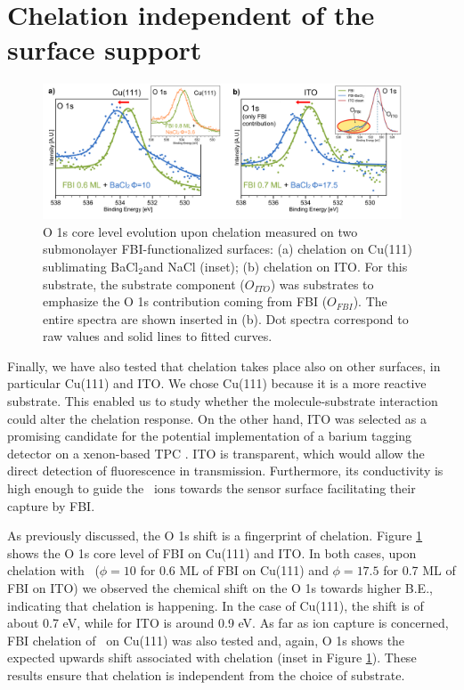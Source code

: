\documentclass[aps,prl,reprint,longbibliography,superscriptaddress, english]{revtex4-1}
\def\BappCl{BaCl$_2$}
\begin{document}
\section{Chelation independent of the surface support}


\begin{figure}[ht!]
	\includegraphics[width=0.95\textwidth]{figures/Figure_5.png}
	\caption{\label{XPS_FBI_Cu_ITO} 
    O 1s core level evolution upon chelation measured on two submonolayer FBI-functionalized surfaces: (a) chelation on Cu(111) sublimating \BappCl and NaCl (inset); (b) chelation on ITO. For this substrate, the substrate component (${O_{ITO}}$) was substrates to emphasize the O 1s contribution coming from FBI (${O_{FBI}}$). The entire spectra are shown inserted in (b). Dot spectra correspond to raw values and solid lines to fitted curves.}
\end{figure} 

Finally, we have also tested that chelation takes place also on other surfaces, in particular Cu(111) and ITO. We chose Cu(111) because it is a more reactive substrate. This enabled us to study whether the molecule-substrate interaction could alter the chelation response. On the other hand, ITO was selected as a promising candidate for the potential implementation of a barium tagging detector on a xenon-based TPC \cite{rivilla_fluorescent_2020}. ITO is transparent, which would allow the direct detection of fluorescence in transmission. Furthermore, its conductivity is high enough to guide the \Bapp\ ions towards the sensor surface facilitating their capture by FBI. 

As previously discussed, the O 1s shift is a fingerprint of chelation. Figure \ref{XPS_FBI_Cu_ITO} shows the O 1s core level of FBI on Cu(111) and ITO. In both cases, upon chelation with \Bapp\ ($\phi = 10$ for 0.6 ML of FBI on Cu(111) and $\phi = 17.5$ for 0.7 ML of FBI on ITO) we observed the chemical shift on the O 1s towards higher B.E., indicating that chelation is happening. In the case of Cu(111), the shift is of about 0.7 eV, while for ITO is around 0.9 eV. As far as ion capture is concerned, FBI chelation of \Nap\  on Cu(111) was also tested and, again, O 1s shows the expected upwards shift associated with chelation (inset in Figure \ref{XPS_FBI_Cu_ITO}). These results ensure that chelation is independent from the choice of substrate.
\end{document}
